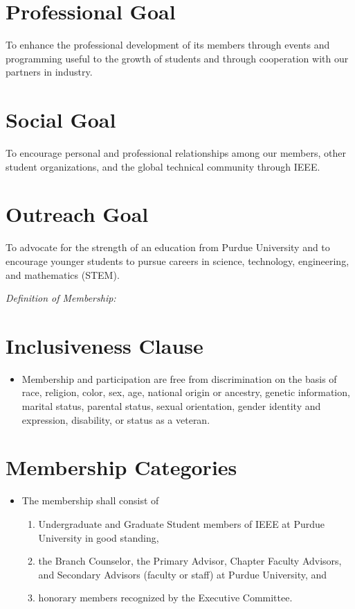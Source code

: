 \documentclass[12pt]{constitution}
\begin{document}
\section{Professional Goal}
\label{sec:purp_prof}
To enhance the professional development of its members through events and programming useful to the growth of students and through cooperation with our partners in industry.

\section{Social Goal}
\label{sec:purp_soc}
To encourage personal and professional relationships among our members, other student organizations, and the global technical community through IEEE.

\section{Outreach Goal}
\label{sec:purp_out}
To advocate for the strength of an education from Purdue University and to encourage younger students to pursue careers in science, technology, engineering, and mathematics (STEM).


\label{art:members}

\textit{Definition of Membership:}

\section{Inclusiveness Clause}
\label{sec:mem_inclusive}
\begin{itemize}
    \item Membership and participation are free from discrimination on the basis of race, religion, color, sex, age, national origin or ancestry, genetic information, marital status, parental status, sexual orientation, gender identity and expression, disability, or status as a veteran.
\end{itemize}

\section{Membership Categories}
\label{sec:mem_categ}
\begin{itemize}
    \item The membership shall consist of
    \begin{enumerate}
        \item Undergraduate and Graduate Student members of IEEE at Purdue University in good standing,
        \item the Branch Counselor, the Primary Advisor, Chapter Faculty Advisors, and Secondary Advisors (faculty or staff) at Purdue University, and
        \item honorary members recognized by the Executive Committee.
    \end{enumerate}
\end{itemize}
\end{document}
